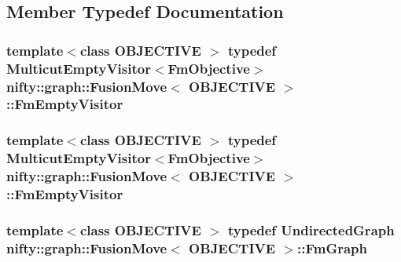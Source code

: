 \subsection{Member Typedef Documentation}
\hypertarget{classnifty_1_1graph_1_1FusionMove_aba3bcdc03f395f2eb0a4b2f4ea26c649}{}
\subsubsection[{Fm\+Empty\+Visitor}]{\setlength{\rightskip}{0pt plus 5cm}template$<$class O\+B\+J\+E\+C\+T\+I\+V\+E $>$ typedef {\bf Multicut\+Empty\+Visitor}$<${\bf Fm\+Objective}$>$ {\bf nifty\+::graph\+::\+Fusion\+Move}$<$ O\+B\+J\+E\+C\+T\+I\+V\+E $>$\+::{\bf Fm\+Empty\+Visitor}}\label{classnifty_1_1graph_1_1FusionMove_aba3bcdc03f395f2eb0a4b2f4ea26c649}
\hypertarget{classnifty_1_1graph_1_1FusionMove_aba3bcdc03f395f2eb0a4b2f4ea26c649}{}
\subsubsection[{Fm\+Empty\+Visitor}]{\setlength{\rightskip}{0pt plus 5cm}template$<$class O\+B\+J\+E\+C\+T\+I\+V\+E $>$ typedef {\bf Multicut\+Empty\+Visitor}$<${\bf Fm\+Objective}$>$ {\bf nifty\+::graph\+::\+Fusion\+Move}$<$ O\+B\+J\+E\+C\+T\+I\+V\+E $>$\+::{\bf Fm\+Empty\+Visitor}}\label{classnifty_1_1graph_1_1FusionMove_aba3bcdc03f395f2eb0a4b2f4ea26c649}
\hypertarget{classnifty_1_1graph_1_1FusionMove_a9192ebd1542c7525e8b3f7416ec92f63}{}
\subsubsection[{Fm\+Graph}]{\setlength{\rightskip}{0pt plus 5cm}template$<$class O\+B\+J\+E\+C\+T\+I\+V\+E $>$ typedef {\bf Undirected\+Graph} {\bf nifty\+::graph\+::\+Fusion\+Move}$<$ O\+B\+J\+E\+C\+T\+I\+V\+E $>$\+::{\bf Fm\+Graph}}\label{classnifty_1_1graph_1_1FusionMove_a9192ebd1542c7525e8b3f7416ec92f63}
\hypertarget{classnifty_1_1graph_1_1FusionMove_a9192ebd1542c7525e8b3f7416ec92f63}{}
